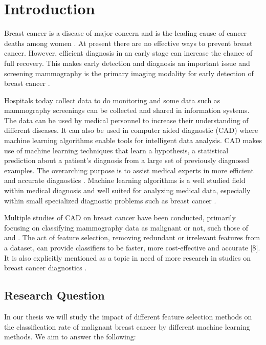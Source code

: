 \chapter{Introduction}

Breast cancer is a disease of major concern and is the leading cause of cancer deaths among women \parencite{althuis2005}. At present there are no effective ways to prevent breast cancer. However, efficient diagnosis in an early stage can increase the chance of full recovery. This makes early detection and diagnosis an important issue and screening mammography is the primary imaging modality for early detection of breast cancer \parencite{tabar2001}.

Hospitals today collect data to do monitoring and some data such as mammography screenings can be collected and shared in information systems. The data can be used by medical personnel to increase their understanding of different diseases. It can also be used in computer aided diagnostic (CAD) where machine learning algorithms enable tools for intelligent data analysis. CAD makes use of machine learning techniques that learn a hypothesis, a statistical prediction about a patient's diagnosis from a large set of previously diagnosed examples.  The overarching purpose is to assist medical experts in more efficient and accurate diagnostics \parencite{li2007}. Machine learning algorithms is a well studied field within medical diagnosis and well suited for analyzing medical data, especially within small specialized diagnostic problems such as breast cancer \parencite{kononenko2001}.

Multiple studies of CAD on breast cancer have been conducted, primarily focusing on classifying mammography data as malignant or not, such those of \textcite{ramos2012} and \textcite{akay2009}. The act of feature selection, removing redundant or irrelevant features from a dataset, can provide classifiers to be faster, more cost-effective and accurate [8]. It is also explicitly mentioned as a topic in need of more research in studies on breast cancer diagnostics \parencite{akin2011}.


\section{Research Question}

In our thesis we will study the impact of different feature selection methods on the classification rate of malignant breast cancer by different machine learning methods. We aim to answer the following:

